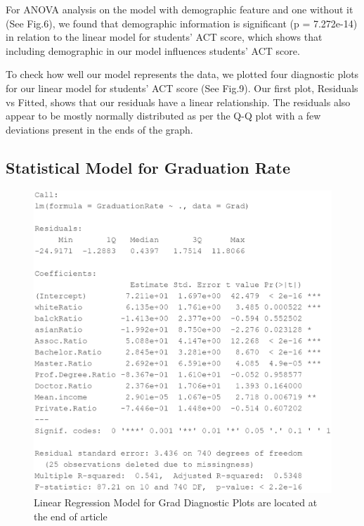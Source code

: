 \documentclass[letterpaper, 10 pt, conference]{ieeeconf}  %
\begin{document}
For ANOVA analysis on the model with demographic feature and one without it (See Fig.6), we found that demographic information is significant (p = 7.272e-14) in relation to the linear model for students' ACT score, which shows that including demographic in our model influences students' ACT score.

To check how well our model represents the data, we plotted four diagnostic plots for our linear model for students' ACT score (See Fig.9).
Our first plot, Residuals vs Fitted, shows that our residuals have a linear relationship.
The residuals also appear to be mostly normally distributed as per the Q-Q plot with a few deviations present in the ends of the graph.

\subsection{Statistical Model for Graduation Rate}

\begin{figure}[h]
\begin{center}
\includegraphics[width=1.0\linewidth]{Summary_Grad_All.PNG}
\end{center}
\caption{Linear Regression Model for Grad
  \newline Diagnostic Plots are located at the end of article}
\label{fig:long}
\label{fig:onecol}
\end{figure}
\end{document}
